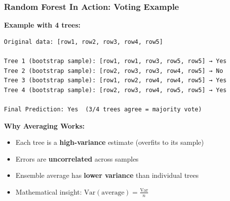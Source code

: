 \documentclass{beamer}
\begin{document}
\begin{frame}[fragile]
\frametitle{Random Forest In Action: Voting Example}

\textbf{Example with 4 trees:}

\vspace{0.2cm}
{\scriptsize
\begin{lstlisting}
Original data: [row1, row2, row3, row4, row5]

Tree 1 (bootstrap sample): [row1, row1, row3, row5, row5] → Yes
Tree 2 (bootstrap sample): [row2, row3, row3, row4, row5] → No
Tree 3 (bootstrap sample): [row1, row2, row4, row4, row5] → Yes
Tree 4 (bootstrap sample): [row2, row3, row4, row5, row5] → Yes

Final Prediction: Yes  (3/4 trees agree = majority vote)
\end{lstlisting}
}

\vspace{0.3cm}
\textbf{Why Averaging Works:}

\begin{itemize}
    \item Each tree is a \textbf{high-variance} estimate (overfits to its sample)
    \item Errors are \textbf{uncorrelated} across samples
    \item Ensemble average has \textbf{lower variance} than individual trees
    \item Mathematical insight: $\text{Var}(\text{average}) = \frac{\text{Var}}{n}$
\end{itemize}

\end{frame}
\end{document}
